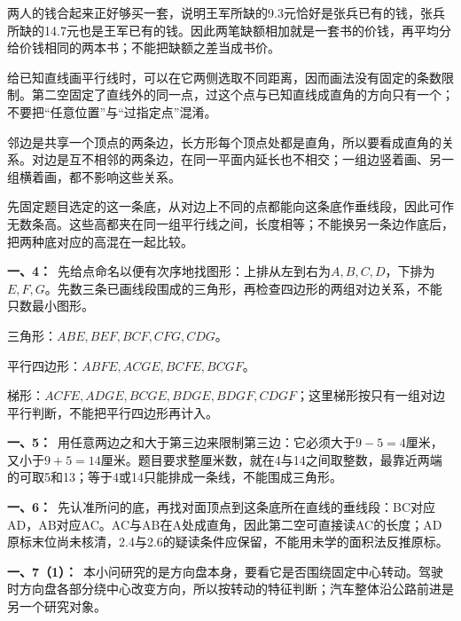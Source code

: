 \documentclass[multi=snippet,border=0pt]{standalone}
\newenvironment{snippet}[3]{\begin{minipage}{#1bp}\color{answerred}\fontsize{#2}{#3}\selectfont\raggedright}{\end{minipage}}
\begin{document}
\begin{snippet}{505}{11.5}{14}两人的钱合起来正好够买一套，说明王军所缺的9.3元恰好是张兵已有的钱，张兵所缺的14.7元也是王军已有的钱。因此两笔缺额相加就是一套书的价钱，再平均分给价钱相同的两本书；不能把缺额之差当成书价。\end{snippet}
\begin{snippet}{505}{11.5}{14}给已知直线画平行线时，可以在它两侧选取不同距离，因而画法没有固定的条数限制。第二空固定了直线外的同一点，过这个点与已知直线成直角的方向只有一个；不要把“任意位置”与“过指定点”混淆。\end{snippet}
\begin{snippet}{505}{11.5}{14}邻边是共享一个顶点的两条边，长方形每个顶点处都是直角，所以要看成直角的关系。对边是互不相邻的两条边，在同一平面内延长也不相交；一组边竖着画、另一组横着画，都不影响这些关系。\end{snippet}
\begin{snippet}{505}{11.5}{14}先固定题目选定的这一条底，从对边上不同的点都能向这条底作垂线段，因此可作无数条高。这些高都夹在同一组平行线之间，长度相等；不能换另一条边作底后，把两种底对应的高混在一起比较。\end{snippet}
\begin{snippet}{505}{11.5}{14}\textbf{一、4：}\ 先给点命名以便有次序地找图形：上排从左到右为\(A,B,C,D\)，下排为\(E,F,G\)。先数三条已画线段围成的三角形，再检查四边形的两组对边关系，不能只数最小图形。\par 三角形：\(ABE,BEF,BCF,CFG,CDG\)。\par 平行四边形：\(ABFE,ACGE,BCFE,BCGF\)。\par 梯形：\(ACFE,ADGE,BCGE,BDGE,BDGF,CDGF\)；这里梯形按只有一组对边平行判断，不能把平行四边形再计入。\end{snippet}
\begin{snippet}{505}{11.5}{14}\textbf{一、5：}\ 用任意两边之和大于第三边来限制第三边：它必须大于\(9-5=4\)厘米，又小于\(9+5=14\)厘米。题目要求整厘米数，就在4与14之间取整数，最靠近两端的可取5和13；等于4或14只能排成一条线，不能围成三角形。\end{snippet}
\begin{snippet}{505}{11.5}{14}\textbf{一、6：}\ 先认准所问的底，再找对面顶点到这条底所在直线的垂线段：BC对应AD，AB对应AC。AC与AB在A处成直角，因此第二空可直接读AC的长度；AD原标末位尚未核清，2.4与2.6的疑读条件应保留，不能用未学的面积法反推原标。\end{snippet}
\begin{snippet}{505}{11.5}{14}\textbf{一、7（1）：}\ 本小问研究的是方向盘本身，要看它是否围绕固定中心转动。驾驶时方向盘各部分绕中心改变方向，所以按转动的特征判断；汽车整体沿公路前进是另一个研究对象。\end{snippet}
\end{document}
